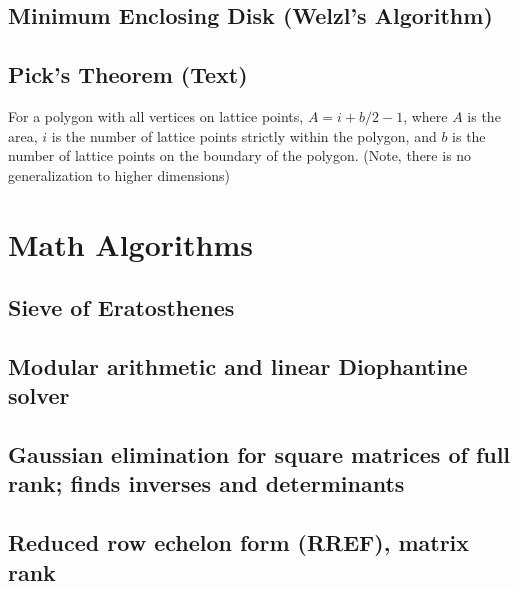 \documentclass[9pt]{extarticle}
\begin{document}
\begin{multicols*}{3}
\subsection{Minimum Enclosing Disk (Welzl's Algorithm)} %


\subsection{Pick's Theorem (Text)} %
For a polygon with all vertices on lattice points, $A = i + b/2 - 1$, where $A$
is the area, $i$ is the number of lattice points strictly within the polygon,
and $b$ is the number of lattice points on the boundary of the polygon. (Note,
there is no generalization to higher dimensions)

\section{Math Algorithms}

\subsection{Sieve of Eratosthenes} %


\subsection{Modular arithmetic and linear Diophantine solver} %


\subsection{Gaussian elimination for square matrices of full rank; finds
inverses and determinants} %


\subsection{Reduced row echelon form (RREF), matrix rank} %



\end{multicols*}
\end{document}

